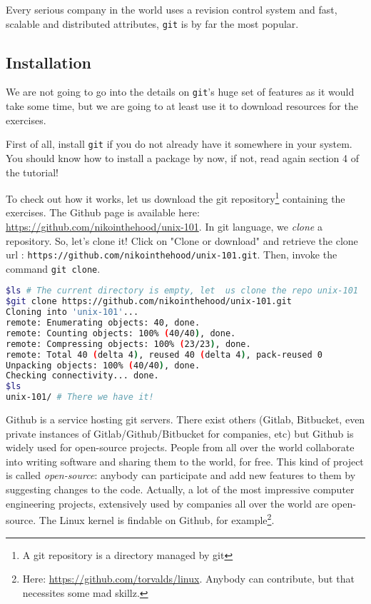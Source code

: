 \documentclass[12pt]{article}
\begin{document}
Every serious company in the world uses a revision control system and fast, scalable and distributed attributes, \texttt{git} is by far the most popular.

\subsection{Installation}

We are not going to go into the details on \texttt{git}'s huge set of features as it would take some time, but we are going to at least use it to download resources for the exercises.

First of all, install \texttt{git} if you do not already have it somewhere in your system. You should know how to install a package by now, if not, read again section 4 of the tutorial!

To check out how it works, let us download the git repository\footnote{A git repository is a directory managed by git} containing the exercises. The Github page is available here: \url{https://github.com/nikointhehood/unix-101}. In git language, we \textit{clone} a repository. So, let's clone it! Click on "Clone or download" and retrieve the clone url : \texttt{https://github.com/nikointhehood/unix-101.git}. Then, invoke the command \texttt{git clone}.

\begin{lstlisting}[language=bash]
$ls # The current directory is empty, let  us clone the repo unix-101
$git clone https://github.com/nikointhehood/unix-101.git
Cloning into 'unix-101'...
remote: Enumerating objects: 40, done.
remote: Counting objects: 100% (40/40), done.
remote: Compressing objects: 100% (23/23), done.
remote: Total 40 (delta 4), reused 40 (delta 4), pack-reused 0
Unpacking objects: 100% (40/40), done.
Checking connectivity... done.
$ls
unix-101/ # There we have it!
\end{lstlisting}

Github is a service hosting git servers. There exist others (Gitlab, Bitbucket, even private instances of Gitlab/Github/Bitbucket for companies, etc) but Github is widely used for open-source projects.
People from all over the world collaborate into writing software and sharing them to the world, for free. This kind of project is called \textit{open-source}: anybody can participate and add new features to them by suggesting changes to the code.
Actually, a lot of the most impressive computer engineering projects, extensively used by companies all over the world are open-source. The Linux kernel is findable on Github, for example\footnote{Here: \url{https://github.com/torvalds/linux}. Anybody can contribute, but that necessites some mad skillz.}.
\end{document}
